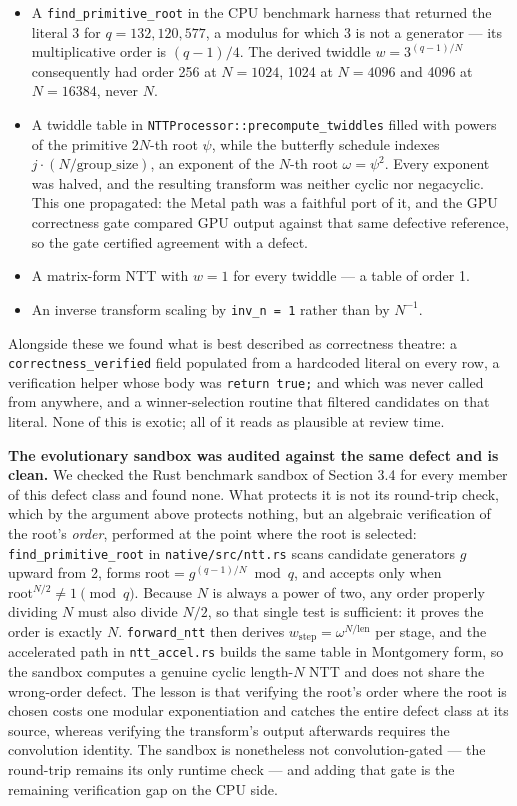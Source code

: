 \begin{itemize}
\tightlist
\item
  A \texttt{find\_primitive\_root} in the CPU benchmark harness that returned the literal 3 for \(q = 132{,}120{,}577\), a modulus for which 3 is not a generator --- its multiplicative order is \((q-1)/4\). The derived twiddle \(w = 3^{(q-1)/N}\) consequently had order 256 at \(N = 1024\), 1024 at \(N = 4096\) and 4096 at \(N = 16384\), never \(N\).
\item
  A twiddle table in \texttt{NTTProcessor::precompute\_twiddles} filled with powers of the primitive \(2N\)-th root \(\psi\), while the butterfly schedule indexes \(j \cdot (N/\text{group\_size})\), an exponent of the \(N\)-th root \(\omega = \psi^2\). Every exponent was halved, and the resulting transform was neither cyclic nor negacyclic. This one propagated: the Metal path was a faithful port of it, and the GPU correctness gate compared GPU output against that same defective reference, so the gate certified agreement with a defect.
\item
  A matrix-form NTT with \(w = 1\) for every twiddle --- a table of order 1.
\item
  An inverse transform scaling by \texttt{inv\_n\ =\ 1} rather than by \(N^{-1}\).
\end{itemize}

Alongside these we found what is best described as correctness theatre: a \texttt{correctness\_verified} field populated from a hardcoded literal on every row, a verification helper whose body was \texttt{return\ true;} and which was never called from anywhere, and a winner-selection routine that filtered candidates on that literal. None of this is exotic; all of it reads as plausible at review time.

\textbf{The evolutionary sandbox was audited against the same defect and is clean.} We checked the Rust benchmark sandbox of Section 3.4 for every member of this defect class and found none. What protects it is not its round-trip check, which by the argument above protects nothing, but an algebraic verification of the root's \emph{order}, performed at the point where the root is selected: \texttt{find\_primitive\_root} in \texttt{native/src/ntt.rs} scans candidate generators \(g\) upward from 2, forms \(\text{root} = g^{(q-1)/N} \bmod q\), and accepts only when \(\text{root}^{N/2} \neq 1 \pmod q\). Because \(N\) is always a power of two, any order properly dividing \(N\) must also divide \(N/2\), so that single test is sufficient: it proves the order is exactly \(N\). \texttt{forward\_ntt} then derives \(w_{\text{step}} = \omega^{N/\text{len}}\) per stage, and the accelerated path in \texttt{ntt\_accel.rs} builds the same table in Montgomery form, so the sandbox computes a genuine cyclic length-\(N\) NTT and does not share the wrong-order defect. The lesson is that verifying the root's order where the root is chosen costs one modular exponentiation and catches the entire defect class at its source, whereas verifying the transform's output afterwards requires the convolution identity. The sandbox is nonetheless not convolution-gated --- the round-trip remains its only runtime check --- and adding that gate is the remaining verification gap on the CPU side.

